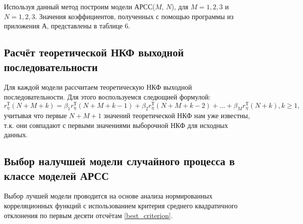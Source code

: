 \documentclass[12pt, fleqn]{article}
\begin{document}
{{{%

Используя данный метод построим модели АРСС($M$, $N$), для $M = 1, 2, 3$ и $N = 1, 2, 3$. Значения коэффициентов, полученных с помощью программы из приложения А, представлены в таблице 6.

		}
		\subsection{Расчёт теоретической НКФ выходной последовательности} {
			Для каждой модели рассчитаем теоретическую НКФ выходной последовательности. Для этого воспользуемся следющией формулой:
			\begin{equation}
				r_\eta^\text{Т}(N + M + k) = \beta_1 r_\eta^\text{Т}(N + M + k - 1) + \beta_2 r_\eta^\text{Т}(N + M + k - 2) + \dots + \beta_M r^\text{Т}_\eta(N + k), k \geq 1,
			\end{equation}
			учитывая что первые $N + M + 1$ значений теоретической НКФ нам уже известны, т.к. они совпадают с первыми значениями выборочной НКФ для исходных данных.
		}
		\subsection{Выбор налучшей модели случайного процесса в классе моделей АРСС} {
			Выбор лучшей модели проводится на основе анализа нормированных корреляционных функций с использованием критерия среднего квадратичного отклонения по первым десяти отсчётам \eqref{best_criterion}. \medskip
					

}}}
\end{document}
